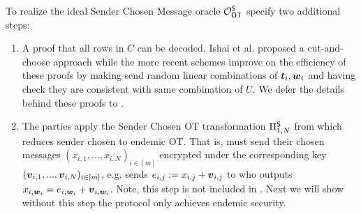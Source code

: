 To realize the ideal Sender Chosen Message oracle $\mathcal{O}_{\mathsf{OT}}^\mathsf{S}$ \cite{C:IKNP03,EC:ALSZ15,C:KelOrsSch15,RSA:OrrOrsSch17} specify two additional steps:
\begin{enumerate}

	\item A proof that all rows in $C$ can be decoded. Ishai et al. \cite{C:IKNP03} proposed a cut-and-choose approach while the more recent schemes \cite{C:KelOrsSch15,RSA:OrrOrsSch17} improve on the efficiency of these proofs by making \rec send random linear combinations of $\boldsymbol{t}_i,\boldsymbol{w}_i$ and having \send check they are consistent with same combination of $U$. We defer the details behind these proofs to \cite{C:KelOrsSch15,RSA:OrrOrsSch17}.
	
	\item The parties apply the Sender Chosen OT transformation $\Pi^{\mathsf{S}}_{1,N}$ from  which reduces sender chosen to endemic OT. That is, \send must send their chosen messages $(x_{i,1},...,x_{i,N})_{i\in [m]}$ encrypted under the corresponding key $(\boldsymbol{v}_{i,1},...,\boldsymbol{v}_{i,N})_{i\in [m]}$, e.g. \send sends $e_{i,j}:=x_{i,j}+\boldsymbol{v}_{i,j}$ to \rec who outputs $x_{i,\boldsymbol{w}_i}=e_{i,\boldsymbol{w}_i}+\boldsymbol{v}_{i,\boldsymbol{w}_i}$. Note, this step is not included in . Next we will show without this step the protocol only achieves endemic security.
\end{enumerate}




